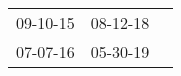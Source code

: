 \begin{supertabular}{lll}
 09-10-15\textsuperscript{} &  08-12-18\textsuperscript{} \\
 07-07-16\textsuperscript{} &  05-30-19\textsuperscript{} \\
\end{supertabular}
